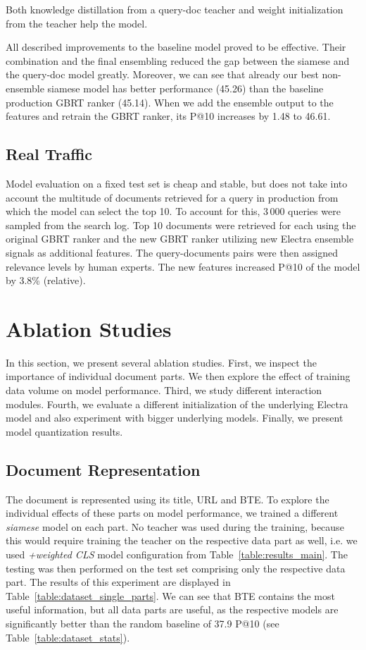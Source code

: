 \documentclass[letterpaper]{article} \usepackage{aaai22 }  \usepackage{times}  \usepackage{helvet}  \usepackage{courier}  \usepackage[hyphens]{url}  \usepackage{graphicx} \usepackage{amsmath,amsfonts,amssymb, mathabx,bm,bbm}
\begin{document}
Both knowledge distillation from a query-doc teacher and weight initialization from the teacher help the model.

All described improvements to the baseline model proved to be effective. Their combination and the final ensembling reduced the gap between the siamese and the query-doc model greatly. Moreover, we can see that already our best non-ensemble siamese model has better performance (45.26) than the baseline production GBRT ranker (45.14). When we add the ensemble output to the features and retrain the GBRT ranker, its P@10 increases by 1.48 to 46.61.

\subsection{Real Traffic}
Model evaluation on a fixed test set is cheap and stable, but does not take into account the multitude of documents retrieved for a query in production from which the model can select the top 10. To account for this, 3\,000 queries were sampled from the search log. Top 10 documents were retrieved for each using the original GBRT ranker and the new GBRT ranker utilizing new Electra ensemble signals as additional features. The query-documents pairs were then assigned relevance levels by human experts. The new features increased P@10 of the model by 3.8\% (relative).


\section{Ablation Studies}\label{sec:ablation_studies}

In this section, we present several ablation studies. First, we inspect the importance of individual document parts. We then explore the effect of training data volume on model performance. Third, we study different interaction modules. Fourth, we evaluate a different initialization of the underlying Electra model and also experiment with bigger underlying models. Finally, we present model quantization results.

\subsection{Document Representation}

The document is represented using its title, URL and BTE. To explore the individual effects of these parts on model performance, we trained a different \textit{siamese} model on each part. No teacher was used during the training, because this would require training the teacher on the respective data part as well, i.e. we used \textit{+weighted CLS} model configuration from Table~\ref{table:results_main}. The testing was then performed on the test set comprising only the respective data part. The results of this experiment are displayed in Table~\ref{table:dataset_single_parts}. We can see that BTE contains the most useful information, but all data parts are useful, as the respective models are significantly better than the random baseline of 37.9 P@10 (see Table~\ref{table:dataset_stats}). 
\end{document}
